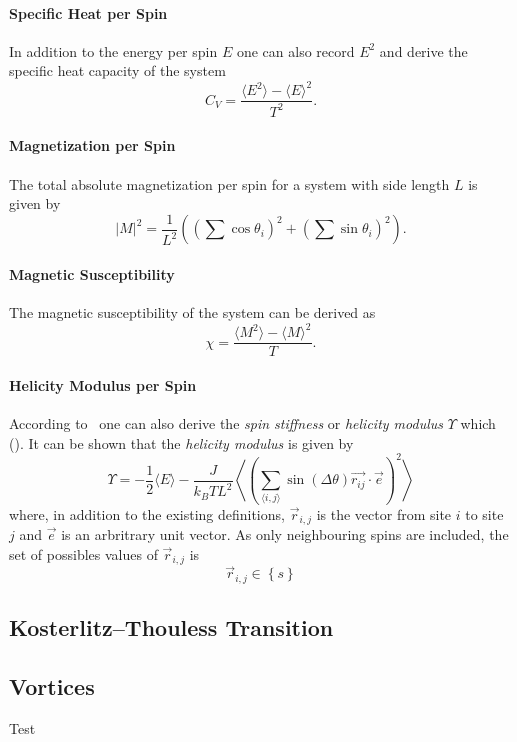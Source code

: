 		\paragraph{Specific Heat per Spin}
			In addition to the energy per spin $E$ one can also record $E^2$ and derive the specific heat capacity of the system
			\begin{equation}
				C_V = \frac{\langle E^2 \rangle - \langle E \rangle^2}{T^2}.
			\end{equation}
		
		\paragraph{Magnetization per Spin}
			The total absolute magnetization per spin for a system with side length $L$ is given by
			\begin{equation}
				\lvert M \rvert^2 = \frac{1}{L^2} \left( (\sum{\cos\theta_i})^2 + (\sum{\sin\theta_i})^2 \right).
			\end{equation}
		
		\paragraph{Magnetic Susceptibility}
			The magnetic susceptibility of the system can be derived as
			\begin{equation}
				\chi = \frac{\langle M^2 \rangle - \langle M \rangle^2}{T}.
			\end{equation}
		
		\paragraph{Helicity Modulus per Spin}
			According to~\cite{teitel_helicity} one can also derive the \emph{spin stiffness} or \emph{helicity modulus} $\Upsilon$ which  (\cite{teitel_helicity}). It can be shown that the \emph{helicity modulus} is given by
			\begin{equation}
				\Upsilon = -\frac{1}{2} \langle E \rangle - \frac{J}{k_B T L^2} \left\langle \left(\sum_{\langle i,j \rangle}{\sin(\Delta \theta) \vec{r_{ij}} \cdot \vec{e}}\right)^2 \right\rangle
			\end{equation}
			where, in addition to the existing definitions, $\vec{r}_{i,j}$ is the vector from site $i$ to site $j$ and $\vec{e}$ is an arbritrary unit vector. As only neighbouring spins are included, the set of possibles values of $\vec{r}_{i,j}$ is
			\begin{equation}
				\vec{r}_{i,j} \in \left\{ s \right\}
			\end{equation}
	
	\subsection{Kosterlitz–Thouless Transition}
	
	\subsection{Vortices}
	Test